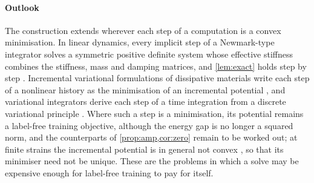\paragraph{Outlook}
The construction extends wherever each step of a computation is a convex minimisation. In
linear dynamics, every implicit step of a Newmark-type integrator solves a symmetric
positive definite system whose effective stiffness combines the stiffness, mass and
damping matrices, and \cref{lem:exact} holds step by step \cite{CaoSong2026}. Incremental
variational formulations of dissipative materials write each step of a nonlinear history as
the minimisation of an incremental potential \cite{OrtizStainier1999}, and variational
integrators derive each step of a time integration from a discrete variational principle
\cite{MarsdenWest2001}. Where such a step is a minimisation, its potential remains a
label-free training objective, although the energy gap is no longer a squared norm, and the
counterparts of \cref{prop:amp,cor:zero} remain to be worked out; at finite strains the
incremental potential is in general not convex \cite{OrtizStainier1999}, so that its
minimiser need not be unique. These are the problems in which a solve may be expensive
enough for label-free training to pay for itself.
